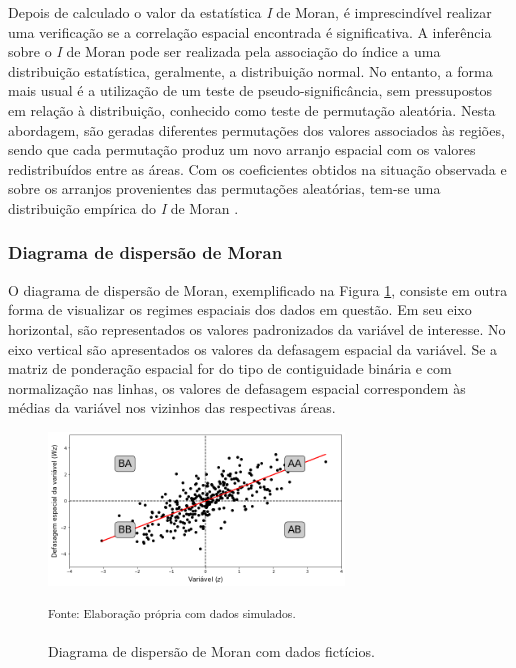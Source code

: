 \documentclass[12pt,a4paper]{article}
\begin{document}
Depois de calculado o valor da estatística \textit{I} de Moran, é imprescindível realizar uma verificação se a correlação espacial encontrada é significativa. A inferência sobre o \textit{I} de Moran pode ser realizada pela associação do índice a uma distribuição estatística, geralmente, a distribuição normal. No entanto, a forma mais usual é a utilização de um teste de pseudo-significância, sem pressupostos em relação à distribuição, conhecido como teste de permutação aleatória. Nesta abordagem, são geradas diferentes permutações dos valores associados às regiões, sendo que cada permutação produz um novo arranjo espacial com os valores redistribuídos entre as áreas. Com os coeficientes obtidos na situação observada e sobre os arranjos provenientes das permutações aleatórias, tem-se uma distribuição empírica do \textit{I} de Moran \cite{camara04_g}.

\subsubsection{Diagrama de dispersão de Moran}
	
O diagrama de dispersão de Moran, exemplificado na Figura \ref{dispersaomoran_2}, consiste em outra forma de visualizar os regimes espaciais dos dados em questão. Em seu eixo horizontal, são representados os valores padronizados da variável de interesse. No eixo vertical são apresentados os valores da defasagem espacial da variável. Se a matriz de ponderação espacial for do tipo de contiguidade binária e com normalização nas linhas, os valores de defasagem espacial correspondem às médias da variável nos vizinhos das respectivas áreas.

\begin{figure}[H]
	\centering
	\caption{Diagrama de dispersão de Moran com dados fictícios.}\label{dispersaomoran_2}
	\includegraphics[width=0.7\textwidth]{figuras/moran_scatter.png}\\
	\parbox{\dimexpr\linewidth-5cm}{\raggedright
    \strut \textsuperscript{Fonte: Elaboração própria com dados simulados.}\strut}
\end{figure}
\end{document}
